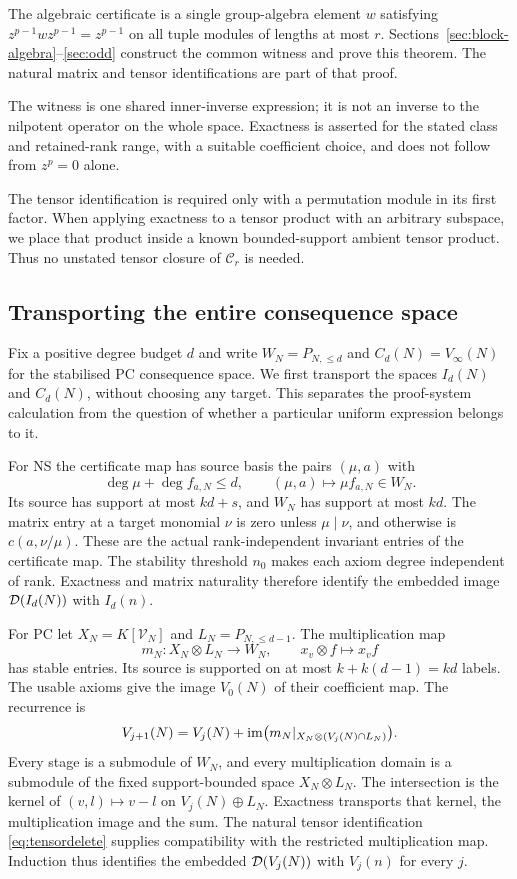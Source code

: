 \documentclass[11pt,a4paper]{article}
\theoremstyle{definition}\newtheorem{definition}[theorem]{Definition}
\theoremstyle{remark}\newtheorem{remark}[theorem]{Remark}
\begin{document}
The algebraic certificate is a single group-algebra element $w$ satisfying
$z^{p-1}wz^{p-1}=z^{p-1}$ on all tuple modules of lengths at most $r$.
Sections~\ref{sec:block-algebra}--\ref{sec:odd} construct the common witness and prove this theorem. The natural matrix and tensor identifications are part of that proof.

The witness is one shared inner-inverse expression; it is not an
inverse to the nilpotent operator on the whole space. Exactness is
asserted for the stated class and retained-rank range, with a suitable
coefficient choice, and does not follow from $z^p=0$ alone.

The tensor identification is required only with a permutation module in its first factor. When applying exactness to a tensor product with an arbitrary subspace, we place that product inside a known bounded-support ambient tensor product. Thus no unstated tensor closure of $\mathcal C_r$ is needed.


\subsection{Transporting the entire consequence space}
Fix a positive degree budget $d$ and write $W_N=P_{N,\le d}$
and $C_d(N)=V_\infty(N)$ for the stabilised PC consequence space.
We first transport the spaces $I_d(N)$ and $C_d(N)$, without choosing
any target. This separates the proof-system calculation from the
question of whether a particular uniform expression belongs to it.

For NS the certificate map has source basis the pairs $(\mu,a)$ with
\[
 \deg\mu+\deg f_{a,N}\le d,
 \qquad (\mu,a)\longmapsto\mu f_{a,N}\in W_N.
\]
Its source has support at most $kd+s$, and $W_N$ has support at most
$kd$. The matrix entry at a target monomial $\nu$ is zero unless
$\mu\mid\nu$, and otherwise is $c(a,\nu/\mu)$. These are the actual
rank-independent invariant entries of the certificate map. The
stability threshold $n_0$ makes each axiom degree independent of rank.
Exactness and matrix naturality therefore identify the embedded image
$\mathcal D(I_d(N))$ with $I_d(n)$.

For PC let $X_N=K[\mathcal V_N]$ and $L_N=P_{N,\le d-1}$.
The multiplication map
\[
       m_N:X_N\otimes L_N\longrightarrow W_N,\qquad
                 x_v\otimes f\longmapsto x_vf
\]
has stable entries. Its source is supported on at most
$k+k(d-1)=kd$ labels. The usable axioms give the image $V_0(N)$
of their coefficient map. The recurrence is
\[
 V_{j+1}(N)=V_j(N)+\operatorname{im}\bigl(m_N|_{X_N\otimes(V_j(N)\cap L_N)}\bigr).
\]
Every stage is a submodule of $W_N$, and every multiplication domain
is a submodule of the fixed support-bounded space $X_N\otimes L_N$.
The intersection is the kernel of $(v,l)\mapsto v-l$ on
$V_j(N)\oplus L_N$. Exactness transports that kernel, the multiplication
image and the sum. The natural tensor identification
\eqref{eq:tensordelete} supplies compatibility with the restricted
multiplication map. Induction thus identifies the embedded
$\mathcal D(V_j(N))$ with $V_j(n)$ for every $j$.
\end{document}

